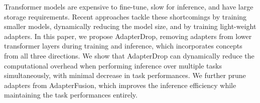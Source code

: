 Transformer models are  expensive to fine-tune, slow for inference, and have large storage requirements. Recent approaches tackle these shortcomings by training smaller models, dynamically reducing the model size, and by training light-weight adapters. In this paper, we propose AdapterDrop, removing adapters from lower transformer layers during training and inference, which incorporates concepts from all three directions.  We show that AdapterDrop can dynamically reduce the computational overhead when performing inference over multiple tasks simultaneously, with minimal decrease in task performances. We further prune adapters from AdapterFusion, which improves the inference efficiency while maintaining the task performances entirely.
